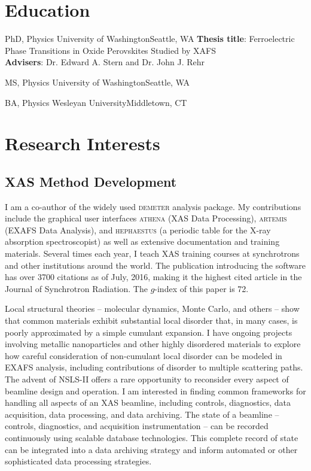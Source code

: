 \documentclass[11pt]{moderncv}
\begin{document}
\section{Education}
        {PhD, Physics}
        {University of Washington}{Seattle, WA}{}
        {\textbf{Thesis title}: Ferroelectric Phase Transitions in Oxide
          Perovskites Studied by XAFS\\
          \textbf{Advisers}: Dr. Edward A. Stern and Dr. John J. Rehr}  %

        {MS, Physics}
        {University of Washington}{Seattle, WA}{}{}

        {BA, Physics}
        {Wesleyan University}{Middletown, CT}{}{}

\pagebreak
\section{Research Interests}

\subsection{XAS Method Development}
%
{I am a co-author of the widely used \textsc{demeter} analysis
  package.  My contributions include the graphical user interfaces
  \textsc{athena} (XAS Data Processing), \textsc{artemis} (EXAFS Data
  Analysis), and \textsc{hephaestus} (a periodic table for the X-ray
  absorption spectroscopist) as well as extensive documentation and
  training materials.  Several times each year, I teach XAS training
  courses at synchrotrons and other institutions around the
  world. \newline{} The publication introducing the software has over
  3700 citations as of July, 2016, making it the highest cited
  article in the Journal of Synchrotron Radiation.  The $g$-index of
  this paper is 72.}

%
{Local structural theories -- molecular dynamics, Monte Carlo,
  and others -- show that common materials exhibit substantial local
  disorder that, in many cases, is poorly approximated by a simple
  cumulant expansion.  I have ongoing projects involving metallic
  nanoparticles and other highly disordered materials to explore how
  careful consideration of non-cumulant local disorder can be modeled
  in EXAFS analysis, including contributions of disorder to multiple
  scattering paths.}
%
%
{The advent of NSLS-II offers a rare opportunity to reconsider every
  aspect of beamline design and operation.  I am interested in finding
  common frameworks for handling all aspects of an XAS beamline,
  including controls, diagnostics, data acquisition, data processing,
  and data archiving.  The state of a beamline -- controls,
  diagnostics, and acquisition instrumentation -- can be recorded
  continuously using scalable database technologies.  This complete
  record of state can be integrated into a data archiving strategy and
  inform automated or other sophisticated data processing strategies.}
\end{document}

